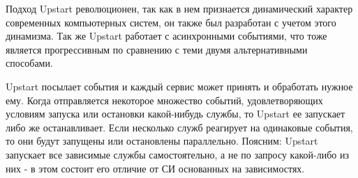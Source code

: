Подход Upstart революционен, так как в нем признается динамический характер современных компьютерных систем, он также был разработан с учетом этого динамизма. Так же Upstart работает с асинхронными событиями, что тоже является прогрессивным по сравнению с теми двумя альтернативными способами.

Upstart посылает события и каждый сервис может принять и обработать нужное ему. Когда отправляется некоторое множество событий, удовлетворяющих условиям запуска или остановки какой-нибудь службы, то Upstart ее запускает либо же останавливает. Если несколько служб реагирует на одинаковые события, то они будут запущены или остановлены параллельно. Поясним: Upstart запускает все зависимые службы самостоятельно, а не по запросу какой-либо из них - в этом состоит его отличие от СИ основанных на зависимостях.